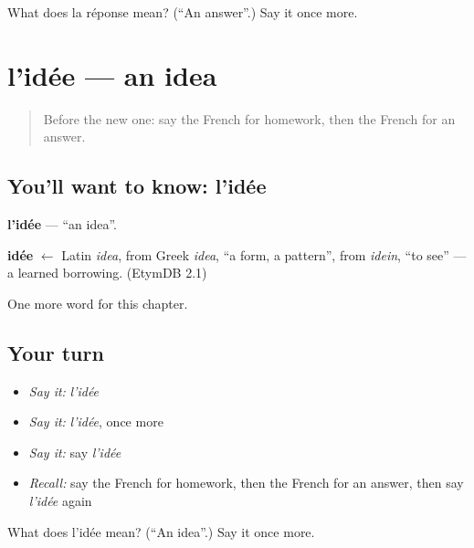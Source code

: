 \begin{tcolorbox}[breakable,colback=teal!4,colframe=teal!35!black,title={Before you move on}]
What does la réponse mean? (\textquotedblleft{}An answer\textquotedblright{}.) Say it once more.
\end{tcolorbox}
\section[l'idée]{l'idée — an idea}

\label{lesson:FR-C127-idee}



\begin{quote}
Before the new one: say the French for homework, then the French for an answer.
\end{quote}

\subsection*{You'll want to know: l'idée}
\textbf{l'idée} — \textquotedblleft{}an idea\textquotedblright{}.

\begin{cousinweb}
\textbf{idée} $\leftarrow$ Latin \emph{idea}, from Greek \emph{idea}, \textquotedblleft{}a form, a pattern\textquotedblright{}, from \emph{idein}, \textquotedblleft{}to see\textquotedblright{} — a learned borrowing. (EtymDB 2.1)
\end{cousinweb}

\begin{grammarlens}[title={What you've built}]
One more word for this chapter.
\end{grammarlens}

\subsection*{Your turn}
\begin{itemize}
\raggedright
  \item \emph{Say it:} \emph{l'idée}
  \item \emph{Say it:} \emph{l'idée}, once more
  \item \emph{Say it:} say \emph{l'idée}
  \item \emph{Recall:} say the French for homework, then the French for an answer, then say \emph{l'idée} again
\end{itemize}

\begin{tcolorbox}[breakable,colback=teal!4,colframe=teal!35!black,title={Before you move on}]
What does l'idée mean? (\textquotedblleft{}An idea\textquotedblright{}.) Say it once more.
\end{tcolorbox}
